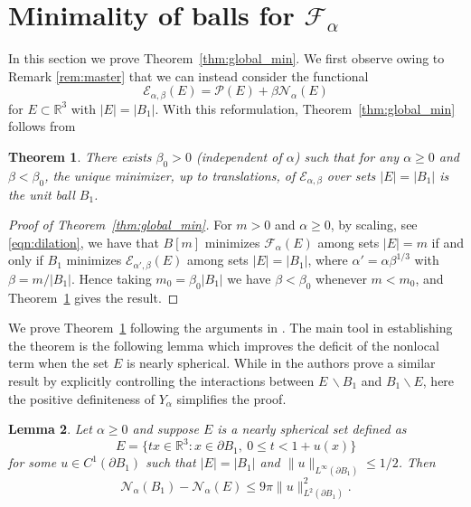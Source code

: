 \documentclass[a4paper,11pt,reqno]{amsart}
\numberwithin{equation}{section}
\newtheorem{theorem}{Theorem}[section]
\newtheorem{lemma}[theorem]{Lemma}
\theoremstyle{remark}
\theoremstyle{definition}
\newcommand{\R}{\mathbb R}
\renewcommand{\setminus}{\backslash}
\newcommand{\ene}{\mathcal{E}_{\alpha,\beta}}
\newcommand{\enf}{\mathcal{F}_{\alpha}}
\newcommand{\nl}{\mathcal{N}_{\alpha}}
\newcommand{\pt}{\partial}
\renewcommand{\leq}{\leqslant}
\renewcommand{\geq}{\geqslant}
\newcommand{\calN}{\mathcal{N}}
\newcommand{\calE}{\mathcal{E}}
\newcommand{\Pe}{\mathcal{P}}
\begin{document}


\section{Minimality of balls for \texorpdfstring{$\enf$}{F\_α}}\label{sec:min_balls}	
In this section we prove Theorem~\ref{thm:global_min}.  We first observe owing to Remark \ref{rem:master} that we can instead consider the functional
	\[
		\ene(E) = \Pe(E)+\beta \calN_{\alpha}(E)
	\]
for $E\subset \mathbb{R}^3$ with $|E|=|B_1|$. With this reformulation, Theorem~\ref{thm:global_min} follows from
\begin{theorem}\label{thm:global_min_beta}
		There exists $\beta_0>0$ (independent of $\alpha$) such that for any $\alpha\geq 0$ and $\beta<\beta_0$, the unique minimizer, up to translations, of $\ene$ over sets $|E|=|B_1|$ is the unit ball $B_1$. 
	\end{theorem}
	
\begin{proof}[Proof of Theorem~\ref{thm:global_min}] For $m>0$ and $\alpha\geq 0$, by scaling, see \eqref{eqn:dilation}, we have that $B[m]$ minimizes $\enf(E)$ among sets $|E|=m$ if and only if $B_1$ minimizes $\calE_{\alpha',\beta}(E)$ among sets $|E|=|B_1|$, where $\alpha'=\alpha\beta^{1/3}$ with $\beta = m/|B_1|$. Hence taking $m_0=\beta_0|B_1|$ we have $\beta<\beta_0$ whenever $m<m_0$, and Theorem~\ref{thm:global_min_beta} gives the result.
\end{proof}

We prove Theorem~\ref{thm:global_min_beta} following the arguments in \cite{CFP}. The main tool in establishing the theorem is the following lemma which improves the deficit of the nonlocal term when the set $E$ is nearly spherical. While in \cite{CFP} the authors prove a similar result by explicitly controlling the interactions between $E\,\setminus B_1$ and $B_1\setminus E$, here the positive definiteness of $Y_\alpha$ simplifies the proof.

	\begin{lemma}\label{lem:nonloc_L2_control}
		Let $\alpha\geq 0$ and suppose $E$ is a nearly spherical set defined as
			\[
				E = \big\{ tx\in \R^3 \colon x\in\pt B_1, \ 0\leq t<1+u(x) \big\}
			\]
		for some $u\in C^1(\pt B_1)$ such that $|E|=|B_1|$ and $\|u\|_{L^{\infty}(\pt B_1)}\leq 1/2$. Then
			\[
				\nl(B_1)-\nl(E) \leq 9\pi\|u\|_{L^2(\pt B_1)}^2.
			\]
	\end{lemma}
	
\end{document}
